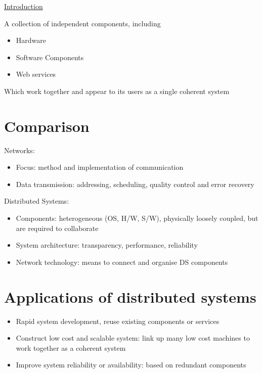\documentclass{article}[18pt]
\begin{document}
\begin{center}
\underline{\huge Introduction}
\end{center}
\begin{defin}
	A collection of independent components, including
	\begin{itemize}
		\item Hardware
		\item Software Components
		\item Web services
	\end{itemize}
	Which work together and appear to its users as a single coherent system
\end{defin}
\section{Comparison}
Networks:
\begin{itemize}
	\item Focus: method and implementation of communication
	\item Data transmission: addressing, scheduling, quality control and error recovery
\end{itemize}
Distributed Systems:
\begin{itemize}
	\item Components: heterogeneous (OS, H/W, S/W), physically loosely coupled, but are required to collaborate
	\item System architecture: transparency, performance, reliability
	\item Network technology: means to connect and organise DS components
\end{itemize}
\section{Applications of distributed systems}
\begin{itemize}
	\item Rapid system development, reuse existing components or services
	\item Construct low cost and scalable system: link up many low cost machines to work together as a coherent system
	\item Improve system reliability or availability: based on redundant components
\end{itemize}
\end{document}
